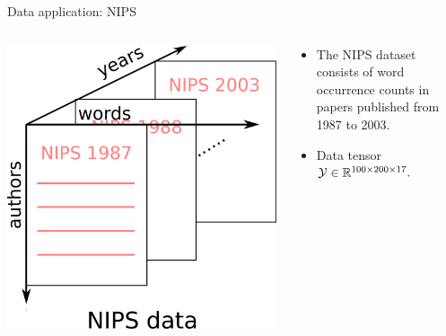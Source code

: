 \documentclass[10pt, mathserif]{beamer} %
\theoremstyle{definition}
\theoremstyle{plain}
\begin{document}
\begin{frame}{Data application: NIPS}
    \begin{columns}
\begin{column}{0.21\textwidth}
   \begin{center}
     \includegraphics[width=\textwidth]{Figures/nipsdata.pdf}
     \end{center}
\end{column}
\begin{column}{0.7\textwidth} 
\begin{itemize}
    \item The NIPS dataset consists of word occurrence counts in papers published from 1987 to 2003.
    \item Data tensor $\mathcal{Y}\in\mathbb{R}^{100\times200\times17}.$ 
\end{itemize}
\end{column}
\end{columns}


\end{frame}
\end{document}

